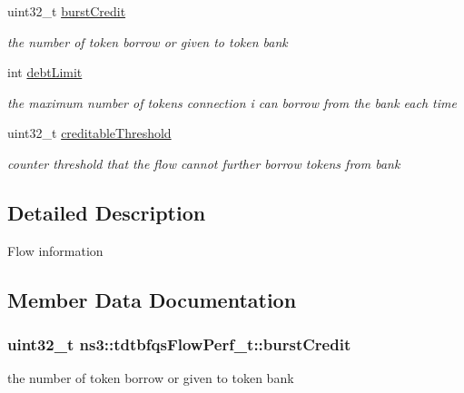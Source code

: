\begin{DoxyCompactItemize}
uint32\+\_\+t \hyperlink{structns3_1_1tdtbfqsFlowPerf__t_af51eb3752319865a9bdd0d4edb1e492d}{burst\+Credit}
\begin{DoxyCompactList}\small\item\em the number of token borrow or given to token bank \end{DoxyCompactList}\item 
int \hyperlink{structns3_1_1tdtbfqsFlowPerf__t_a07a234eaf1d3054d05d03936923ff683}{debt\+Limit}
\begin{DoxyCompactList}\small\item\em the maximum number of tokens connection i can borrow from the bank each time \end{DoxyCompactList}\item 
uint32\+\_\+t \hyperlink{structns3_1_1tdtbfqsFlowPerf__t_a64c93060e3a4a5a729d5ecb52a1354f9}{creditable\+Threshold}
\begin{DoxyCompactList}\small\item\em counter threshold that the flow cannot further borrow tokens from bank \end{DoxyCompactList}\end{DoxyCompactItemize}


\subsection{Detailed Description}
Flow information 

\subsection{Member Data Documentation}
\subsubsection[{\texorpdfstring{burst\+Credit}{burstCredit}}]{\setlength{\rightskip}{0pt plus 5cm}uint32\+\_\+t ns3\+::tdtbfqs\+Flow\+Perf\+\_\+t\+::burst\+Credit}\hypertarget{structns3_1_1tdtbfqsFlowPerf__t_af51eb3752319865a9bdd0d4edb1e492d}{}\label{structns3_1_1tdtbfqsFlowPerf__t_af51eb3752319865a9bdd0d4edb1e492d}


the number of token borrow or given to token bank 

